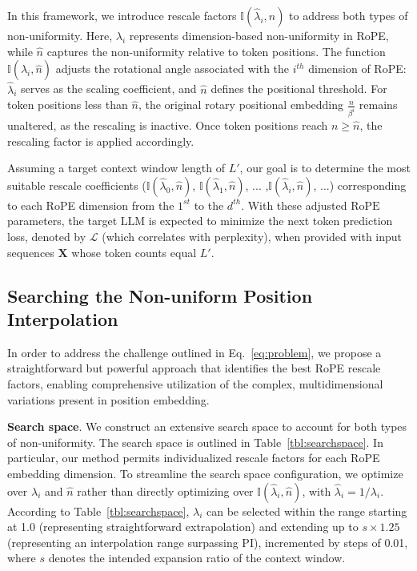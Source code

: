 In this framework, we introduce rescale factors $\mathbb{I}(\hat{\lambda}_{i},\hat{n})$ to address both types of non-uniformity. Here, $\hat{\lambda_i}$ represents dimension-based non-uniformity in RoPE, while $\hat{n}$ captures the non-uniformity relative to token positions. The function $\mathbb{I}(\hat{\lambda}_{i},\hat{n})$ adjusts the rotational angle associated with the $i^{th}$ dimension of RoPE: $\hat\lambda_{i}$ serves as the scaling coefficient, and $\hat{n}$ defines the positional threshold. For token positions less than $\hat{n}$, the original rotary positional embedding $\frac{n}{\beta^i}$ remains unaltered, as the rescaling is inactive. Once token positions reach $n \ge \hat{n}$, the rescaling factor is applied accordingly.

Assuming a target context window length of $L'$, our goal is to determine the most suitable rescale coefficients ($\mathbb{I}(\hat{\lambda}_{0},\hat{n})$, $\mathbb{I}(\hat{\lambda}_{1},\hat{n})$, ... ,$\mathbb{I}(\hat{\lambda}_{i},\hat{n})$, ...) corresponding to each RoPE dimension from the $1^{st}$ to the $d^{th}$. With these adjusted $\text{RoPE}$ parameters, the target $\text{LLM}$ is expected to minimize the next token prediction loss, denoted by $\mathcal{L}$ (which correlates with perplexity), when provided with input sequences $\mathbf{X}$ whose token counts equal $L'$.

\subsection{Searching the Non-uniform Position Interpolation}

In order to address the challenge outlined in Eq.~\ref{eq:problem}, we propose a straightforward but powerful approach that identifies the best RoPE rescale factors, enabling comprehensive utilization of the complex, multidimensional variations present in position embedding.

\textbf{Search space}. We construct an extensive search space to account for both types of non-uniformity. The search space is outlined in Table~\ref{tbl:searchspace}. In particular, our method permits individualized rescale factors for each RoPE embedding dimension. To streamline the search space configuration, we optimize over $\lambda_i$ and $\hat{n}$ rather than directly optimizing over $\mathbb{I}(\hat{\lambda}_{i},\hat{n})$, with $\hat{\lambda}_{i}=1/\lambda_i$. According to Table~\ref{tbl:searchspace}, $\lambda_i$ can be selected within the range starting at 1.0 (representing straightforward extrapolation) and extending up to $s\times1.25$ (representing an interpolation range surpassing PI), incremented by steps of 0.01, where $s$ denotes the intended expansion ratio of the context window.

